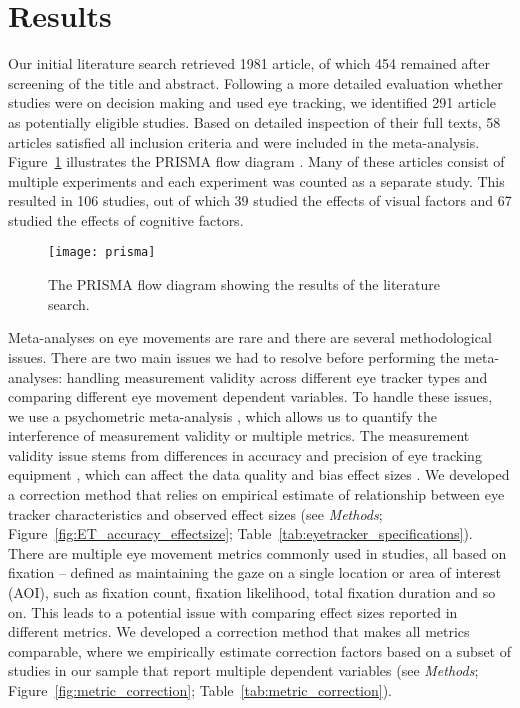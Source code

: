 \documentclass{article}
\begin{document}

\section{Results}

Our initial literature search retrieved 1981 article, of which 454 remained after screening of the title and abstract. Following a more detailed evaluation whether studies were on decision making and used eye tracking, we identified 291 article as potentially eligible studies. Based on detailed inspection of their full texts, 58 articles satisfied all inclusion criteria and were included in the meta-analysis. Figure~\ref{fig:flow_diagram} illustrates the PRISMA flow diagram \citep{moher2009preferred}. Many of these articles consist of multiple experiments and each experiment was counted as a separate study. This resulted in 106 studies, out of which 39 studied the effects of visual factors and 67 studied the effects of cognitive factors.


\begin{figure}[H]
\texttt{[image: prisma]}
\centering
\caption{The PRISMA flow diagram showing the results of the literature search.}
\label{fig:flow_diagram}
\end{figure}


Meta-analyses on eye movements are rare and there are several methodological issues. There are two main issues we had to resolve before performing the meta-analyses: handling measurement validity across different eye tracker types and comparing different eye movement dependent variables. To handle these issues, we use a psychometric meta-analysis \citep{hunter2004a}, which allows us to quantify the interference of measurement validity or multiple metrics. The measurement validity issue stems from differences in accuracy and precision of eye tracking equipment \citep{holmqvist2015a}, which can affect the data quality and bias effect sizes \citep{orquin2016a}. We developed a correction method that relies on empirical estimate of relationship between eye tracker characteristics and observed effect sizes (see \textit{Methods}; Figure~\ref{fig:ET_accuracy_effectsize}; Table~\ref{tab:eyetracker_specifications}). There are multiple eye movement metrics commonly used in studies, all based on fixation -- defined as maintaining the gaze on a single location or area of interest (AOI), such as fixation count, fixation likelihood, total fixation duration and so on. This leads to a potential issue with comparing effect sizes reported in different metrics. We developed a correction method that makes all metrics comparable, where we empirically estimate correction factors based on a subset of studies in our sample that report multiple dependent variables (see \textit{Methods}; Figure~\ref{fig:metric_correction}; Table~\ref{tab:metric_correction}). %
\end{document}
